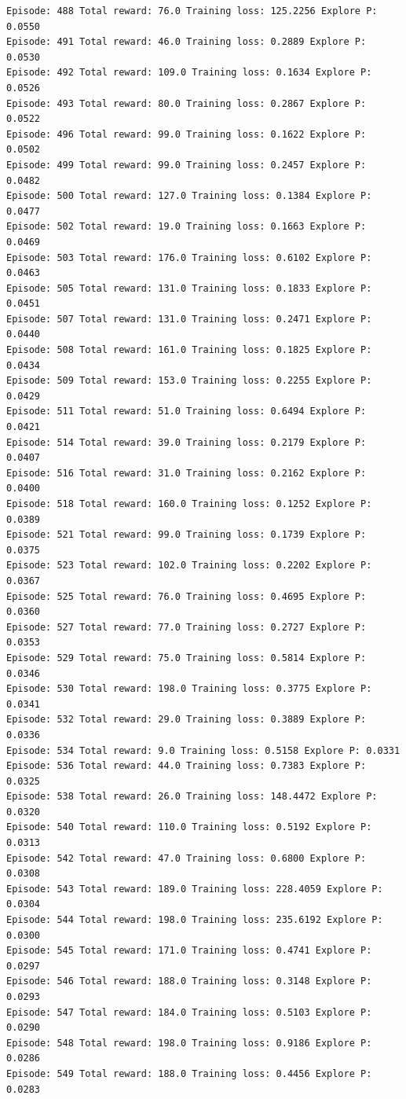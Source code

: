 \documentclass[11pt]{article}
\begin{document}
\begin{Verbatim}[commandchars=\\\{\}]
Episode: 488 Total reward: 76.0 Training loss: 125.2256 Explore P: 0.0550
Episode: 491 Total reward: 46.0 Training loss: 0.2889 Explore P: 0.0530
Episode: 492 Total reward: 109.0 Training loss: 0.1634 Explore P: 0.0526
Episode: 493 Total reward: 80.0 Training loss: 0.2867 Explore P: 0.0522
Episode: 496 Total reward: 99.0 Training loss: 0.1622 Explore P: 0.0502
Episode: 499 Total reward: 99.0 Training loss: 0.2457 Explore P: 0.0482
Episode: 500 Total reward: 127.0 Training loss: 0.1384 Explore P: 0.0477
Episode: 502 Total reward: 19.0 Training loss: 0.1663 Explore P: 0.0469
Episode: 503 Total reward: 176.0 Training loss: 0.6102 Explore P: 0.0463
Episode: 505 Total reward: 131.0 Training loss: 0.1833 Explore P: 0.0451
Episode: 507 Total reward: 131.0 Training loss: 0.2471 Explore P: 0.0440
Episode: 508 Total reward: 161.0 Training loss: 0.1825 Explore P: 0.0434
Episode: 509 Total reward: 153.0 Training loss: 0.2255 Explore P: 0.0429
Episode: 511 Total reward: 51.0 Training loss: 0.6494 Explore P: 0.0421
Episode: 514 Total reward: 39.0 Training loss: 0.2179 Explore P: 0.0407
Episode: 516 Total reward: 31.0 Training loss: 0.2162 Explore P: 0.0400
Episode: 518 Total reward: 160.0 Training loss: 0.1252 Explore P: 0.0389
Episode: 521 Total reward: 99.0 Training loss: 0.1739 Explore P: 0.0375
Episode: 523 Total reward: 102.0 Training loss: 0.2202 Explore P: 0.0367
Episode: 525 Total reward: 76.0 Training loss: 0.4695 Explore P: 0.0360
Episode: 527 Total reward: 77.0 Training loss: 0.2727 Explore P: 0.0353
Episode: 529 Total reward: 75.0 Training loss: 0.5814 Explore P: 0.0346
Episode: 530 Total reward: 198.0 Training loss: 0.3775 Explore P: 0.0341
Episode: 532 Total reward: 29.0 Training loss: 0.3889 Explore P: 0.0336
Episode: 534 Total reward: 9.0 Training loss: 0.5158 Explore P: 0.0331
Episode: 536 Total reward: 44.0 Training loss: 0.7383 Explore P: 0.0325
Episode: 538 Total reward: 26.0 Training loss: 148.4472 Explore P: 0.0320
Episode: 540 Total reward: 110.0 Training loss: 0.5192 Explore P: 0.0313
Episode: 542 Total reward: 47.0 Training loss: 0.6800 Explore P: 0.0308
Episode: 543 Total reward: 189.0 Training loss: 228.4059 Explore P: 0.0304
Episode: 544 Total reward: 198.0 Training loss: 235.6192 Explore P: 0.0300
Episode: 545 Total reward: 171.0 Training loss: 0.4741 Explore P: 0.0297
Episode: 546 Total reward: 188.0 Training loss: 0.3148 Explore P: 0.0293
Episode: 547 Total reward: 184.0 Training loss: 0.5103 Explore P: 0.0290
Episode: 548 Total reward: 198.0 Training loss: 0.9186 Explore P: 0.0286
Episode: 549 Total reward: 188.0 Training loss: 0.4456 Explore P: 0.0283

\end{Verbatim}
\end{document}
